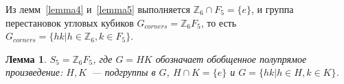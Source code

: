 \documentclass[utf8,a4paper,12pt]{article}
\newtheorem{lemma_cub}{Лемма}[section]
\begin{document}
Из лемм~\ref{lemma4} и~\ref{lemma5} выполняется $\mathbb{Z}_6\cap F_5=\{e\}$, и группа перестановок угловых кубиков $G_{corners}=\mathbb{Z}_6F_5$, то есть $G_{corners}=\{hk|h\in\mathbb{Z}_6,k\in F_5\}$.
\begin{lemma_cub}
$S_5=\mathbb{Z}_6F_5$, где $G=HK$ обозначает обобщенное полупрямое произведение: $H, K$~--- подгруппы в $G$, $H\cap K=\{e\}$ и $G=\{hk|h\in H, k\in K\}$.
\end{lemma_cub}
\end{document}
